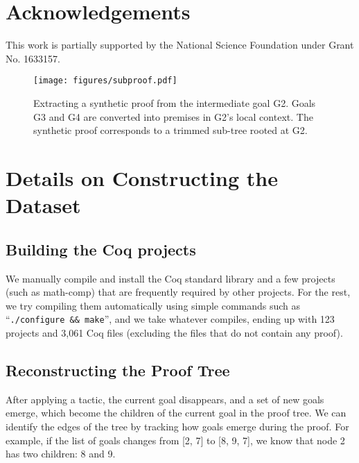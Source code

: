 \documentclass{article}
\newcommand{\numberoffiles}{3,061 }
\newcommand{\numberofprojects}{123 }
\begin{document}
\section*{Acknowledgements} 


This work is partially supported by the National Science Foundation under
Grant No. 1633157.

\renewcommand\thefigure{\Alph{figure}}
\begin{figure*}[ht]
\begin{center}
\centerline{\texttt{[image: figures/subproof.pdf]}}
\caption{Extracting a synthetic proof from the intermediate goal G2. Goals G3 and G4 are converted into premises in G2's local context. The synthetic proof corresponds to a trimmed sub-tree rooted at G2.}
\label{fig:subproof}
\end{center}
\end{figure*}


\renewcommand{\appendixpagename}{Appendix}
\appendix
\appendixpage




\section{Details on Constructing the Dataset}
\label{appendix:details}




\subsection{Building the Coq projects}

We manually compile and install the Coq standard library and a few projects (such as math-comp) that are frequently required by other projects.
For the rest, we try compiling them automatically using simple commands such as  ``\texttt{./configure \&\& make}'', and we take whatever compiles,
ending up with \numberofprojects projects and \numberoffiles Coq files (excluding the files that do not contain any proof).



\subsection{Reconstructing the Proof Tree}

After applying a tactic, the current goal disappears, and a set of new goals emerge, which become the children of the current goal in the proof tree. 
We can identify the edges of the tree by tracking how goals emerge during the proof.
For example, if the list of goals changes from [2, 7] to [8, 9, 7], we know that node 2 has two children: 8 and 9. 
\end{document}

